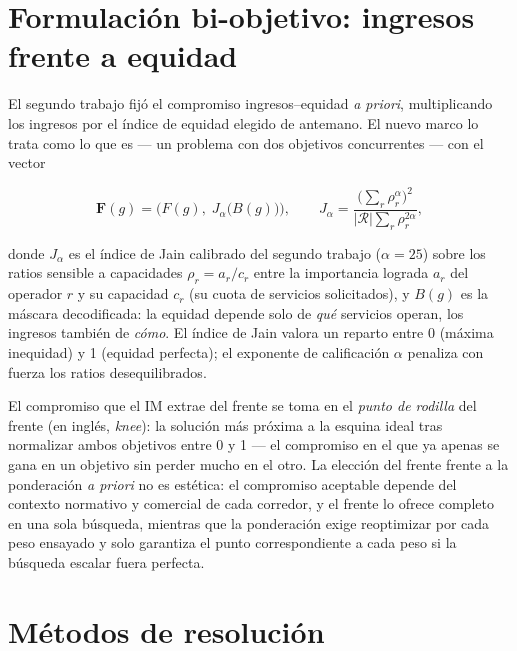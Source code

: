\documentclass[11pt,a4paper]{article}
\begin{document}
\section{Formulación bi-objetivo: ingresos frente a equidad}
\label{sec:biobjetivo}

El segundo trabajo fijó el compromiso ingresos--equidad \emph{a priori},
multiplicando los ingresos por el índice de equidad elegido de antemano. El
nuevo marco lo trata como lo que es --- un problema con dos objetivos
concurrentes --- con el vector

\begin{equation}
\mathbf{F}(g) = \big(F(g),\; J_{\alpha}\big(B(g)\big)\big),
\qquad J_{\alpha} = \frac{\big(\sum_r \rho_r^{\alpha}\big)^2}
{|\mathcal{R}| \sum_r \rho_r^{2\alpha}},
\end{equation}

donde $J_{\alpha}$ es el índice de Jain calibrado del segundo trabajo
($\alpha = 25$) sobre los ratios sensible a capacidades
$\rho_r = a_r / c_r$ entre la importancia lograda $a_r$ del operador $r$ y
su capacidad $c_r$ (su cuota de servicios solicitados), y $B(g)$ es la
máscara decodificada: la equidad depende solo de \emph{qué} servicios
operan, los ingresos también de \emph{cómo}. El índice de Jain valora un
reparto entre 0 (máxima inequidad) y 1 (equidad perfecta); el exponente de
calificación $\alpha$ penaliza con fuerza los ratios desequilibrados.

El compromiso que el IM extrae del frente se toma en el \emph{punto de
rodilla} del frente (en inglés, \emph{knee}): la solución más próxima a la
esquina ideal tras normalizar ambos objetivos entre 0 y 1 --- el compromiso
en el que ya apenas se gana en un objetivo sin perder mucho en el otro.
La elección del frente frente a la ponderación \emph{a priori} no es
estética: el compromiso aceptable depende del contexto normativo y comercial
de cada corredor, y el frente lo ofrece completo en una sola búsqueda,
mientras que la ponderación exige reoptimizar por cada peso ensayado y solo
garantiza el punto correspondiente a cada peso si la búsqueda escalar fuera
perfecta.

\section{Métodos de resolución}
\label{sec:metodos}
\end{document}
